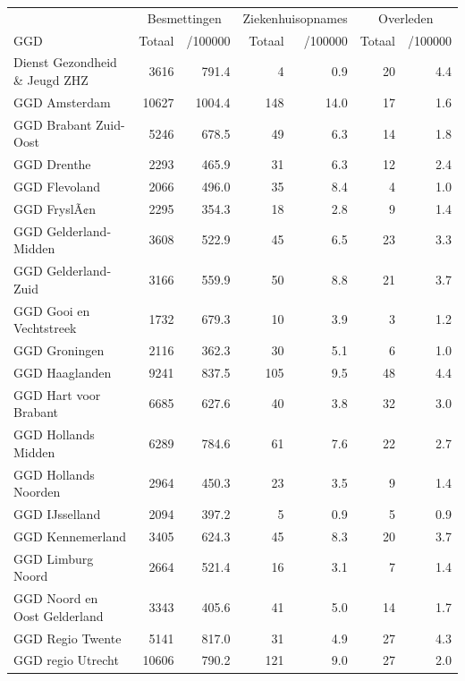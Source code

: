 \documentclass[
  english,
  man,floatsintext]{apa6}
\begin{document}
\begin{table}[H]
\centering\begingroup\fontsize{10}{12}\selectfont

\begin{threeparttable}
\begin{tabular}{lrrrrrr}
\toprule
\multicolumn{1}{c}{ } & \multicolumn{2}{c}{Besmettingen} & \multicolumn{2}{c}{Ziekenhuisopnames} & \multicolumn{2}{c}{Overleden} \\
\cmidrule(l{3pt}r{3pt}){2-3} \cmidrule(l{3pt}r{3pt}){4-5} \cmidrule(l{3pt}r{3pt}){6-7}
GGD & Totaal & /100000 & Totaal & /100000 & Totaal & /100000\\
\midrule
Dienst Gezondheid \& Jeugd ZHZ & 3616 & 791.4 & 4 & 0.9 & 20 & 4.4\\
GGD Amsterdam & 10627 & 1004.4 & 148 & 14.0 & 17 & 1.6\\
GGD Brabant Zuid-Oost & 5246 & 678.5 & 49 & 6.3 & 14 & 1.8\\
GGD Drenthe & 2293 & 465.9 & 31 & 6.3 & 12 & 2.4\\
GGD Flevoland & 2066 & 496.0 & 35 & 8.4 & 4 & 1.0\\
GGD FryslÃ¢n & 2295 & 354.3 & 18 & 2.8 & 9 & 1.4\\
GGD Gelderland-Midden & 3608 & 522.9 & 45 & 6.5 & 23 & 3.3\\
GGD Gelderland-Zuid & 3166 & 559.9 & 50 & 8.8 & 21 & 3.7\\
GGD Gooi en Vechtstreek & 1732 & 679.3 & 10 & 3.9 & 3 & 1.2\\
GGD Groningen & 2116 & 362.3 & 30 & 5.1 & 6 & 1.0\\
GGD Haaglanden & 9241 & 837.5 & 105 & 9.5 & 48 & 4.4\\
GGD Hart voor Brabant & 6685 & 627.6 & 40 & 3.8 & 32 & 3.0\\
GGD Hollands Midden & 6289 & 784.6 & 61 & 7.6 & 22 & 2.7\\
GGD Hollands Noorden & 2964 & 450.3 & 23 & 3.5 & 9 & 1.4\\
GGD IJsselland & 2094 & 397.2 & 5 & 0.9 & 5 & 0.9\\
GGD Kennemerland & 3405 & 624.3 & 45 & 8.3 & 20 & 3.7\\
GGD Limburg Noord & 2664 & 521.4 & 16 & 3.1 & 7 & 1.4\\
GGD Noord en Oost Gelderland & 3343 & 405.6 & 41 & 5.0 & 14 & 1.7\\
GGD Regio Twente & 5141 & 817.0 & 31 & 4.9 & 27 & 4.3\\
GGD regio Utrecht & 10606 & 790.2 & 121 & 9.0 & 27 & 2.0\\

\end{tabular}
\end{threeparttable}
\end{table}
\end{document}
